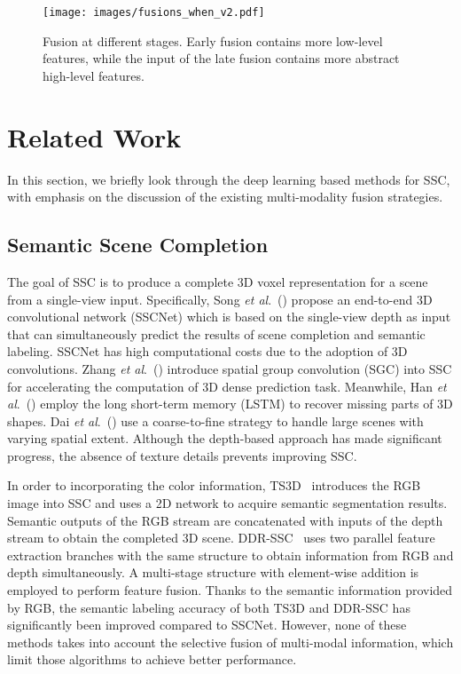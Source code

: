 \documentclass[10pt,twocolumn,letterpaper]{article}
\def\etal{\emph{et al}.}
\begin{document}
\begin{figure}[t]
\begin{center}   
{
\texttt{[image: images/fusions\_when\_v2.pdf]}
}
\caption{Fusion at different stages. 
Early fusion contains more low-level features, while the input of the late fusion contains more abstract high-level features.
}
\vspace{-0.7cm}
\label{fig:fusion-when}
\end{center}
\end{figure}
\section{Related Work}
In this section, we briefly look through the deep learning based methods for SSC, with emphasis on the discussion of the existing multi-modality fusion strategies.

\vspace{-0.1cm}
\subsection{Semantic Scene Completion}

The goal of SSC is to produce a complete 3D voxel representation for a scene from a single-view input.
Specifically, Song \etal~(\cite{song2017_SSCNet}) propose an end-to-end 3D convolutional network (SSCNet) which is based on the single-view depth as input that can simultaneously predict the results of scene completion and semantic labeling.
SSCNet has high computational costs due to the adoption of 3D convolutions. 
Zhang \etal~(\cite{zhang2018efficient}) introduce spatial group convolution (SGC) into SSC for accelerating the computation of 3D dense prediction task. 
Meanwhile, Han \etal~(\cite{han2017high}) employ the long short-term memory (LSTM) to recover missing parts of 3D shapes.
Dai \etal~(\cite{dai2018scancomplete}) use a coarse-to-fine strategy to handle large scenes with varying spatial extent.
Although the depth-based approach has made significant progress, the absence of texture details prevents improving SSC.  


In order to incorporating the color information, TS3D~\cite{Garbade2018_twoStream} introduces the RGB image into SSC and uses a 2D network to acquire semantic segmentation results.
Semantic outputs of the RGB stream are concatenated with inputs of the depth stream to obtain the completed 3D scene. DDR-SSC~\cite{li2019rgbd} uses two parallel feature extraction branches with the same structure to obtain information from RGB and depth simultaneously.
A multi-stage structure with element-wise addition is employed to perform feature fusion.
Thanks to the semantic information provided by RGB, the semantic labeling accuracy of both TS3D and DDR-SSC has significantly been improved compared to SSCNet. However, none of these methods takes into account the selective fusion of multi-modal information, which limit those algorithms to achieve better performance.
\end{document}
